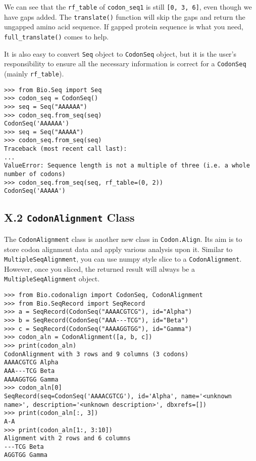 \documentclass{article}
\begin{document}
We can see that the \texttt{rf\_table} of \texttt{codon\_seq1} is still
\texttt{{[}0, 3, 6{]}}, even though we have gaps added. The
\texttt{translate()} function will skip the gaps and return the ungapped
amino acid sequence. If gapped protein sequence is what you need,
\texttt{full\_translate()} comes to help.

It is also easy to convert \texttt{Seq} object to \texttt{CodonSeq}
object, but it is the user's responsibility to ensure all the necessary
information is correct for a \texttt{CodonSeq} (mainly
\texttt{rf\_table}).

\begin{verbatim}
>>> from Bio.Seq import Seq
>>> codon_seq = CodonSeq()
>>> seq = Seq("AAAAAA")
>>> codon_seq.from_seq(seq)
CodonSeq('AAAAAA')
>>> seq = Seq("AAAAA")
>>> codon_seq.from_seq(seq)
Traceback (most recent call last):
...
ValueError: Sequence length is not a multiple of three (i.e. a whole number of codons)
>>> codon_seq.from_seq(seq, rf_table=(0, 2))
CodonSeq('AAAAA')
\end{verbatim}

\subsection{X.2 \texttt{CodonAlignment} Class}

The \texttt{CodonAlignment} class is another new class in
\texttt{Codon.Align}. Its aim is to store codon alignment data and
apply various analysis upon it. Similar to
\texttt{MultipleSeqAlignment}, you can use numpy style slice to a
\texttt{CodonAlignment}. However, once you sliced, the returned result
will always be a \texttt{MultipleSeqAlignment} object.

\begin{verbatim}
>>> from Bio.codonalign import CodonSeq, CodonAlignment
>>> from Bio.SeqRecord import SeqRecord
>>> a = SeqRecord(CodonSeq("AAAACGTCG"), id="Alpha")
>>> b = SeqRecord(CodonSeq("AAA---TCG"), id="Beta")
>>> c = SeqRecord(CodonSeq("AAAAGGTGG"), id="Gamma")
>>> codon_aln = CodonAlignment([a, b, c])
>>> print(codon_aln)
CodonAlignment with 3 rows and 9 columns (3 codons)
AAAACGTCG Alpha
AAA---TCG Beta
AAAAGGTGG Gamma
>>> codon_aln[0]
SeqRecord(seq=CodonSeq('AAAACGTCG'), id='Alpha', name='<unknown name>', description='<unknown description>', dbxrefs=[])
>>> print(codon_aln[:, 3])
A-A
>>> print(codon_aln[1:, 3:10])
Alignment with 2 rows and 6 columns
---TCG Beta
AGGTGG Gamma
\end{verbatim}
\end{document}
